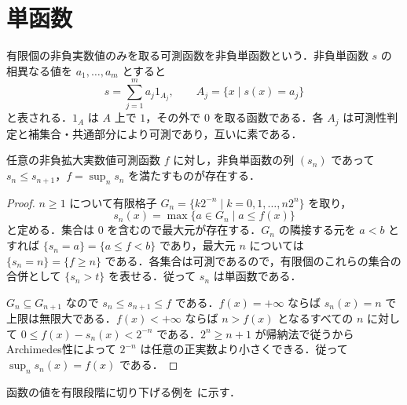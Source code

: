 \section{単函数}
\begin{defn}[単函数]
有限個の非負実数値のみを取る可測函数を非負単函数という．非負単函数 $s$ の相異なる値を $a_1,\ldots,a_m$ とすると
\[
 s=\sum_{j=1}^m a_j1_{A_j},\qquad A_j=\{x\mid s(x)=a_j\}
\]
と表される．$1_A$ は $A$ 上で $1$，その外で $0$ を取る函数である．各 $A_j$ は可測性判定と補集合・共通部分により可測であり，互いに素である．
\end{defn}
\begin{prop}[非負可測函数の単函数近似]
任意の非負拡大実数値可測函数 $f$ に対し，非負単函数の列 $(s_n)$ であって $s_n\leq s_{n+1}$，$f=\sup_n s_n$ を満たすものが存在する．
\end{prop}
\begin{proof}
$n\geq1$ について有限格子 $G_n=\{k2^{-n}\mid k=0,1,\ldots,n2^n\}$ を取り，
\[
 s_n(x)=\max\{a\in G_n\mid a\leq f(x)\}
\]
と定める．集合は $0$ を含むので最大元が存在する．$G_n$ の隣接する元を $a<b$ とすれば $\{s_n=a\}=\{a\leq f<b\}$ であり，最大元 $n$ については $\{s_n=n\}=\{f\geq n\}$ である．各集合は可測であるので，有限個のこれらの集合の合併として $\{s_n>t\}$ を表せる．従って $s_n$ は単函数である．

$G_n\subseteq G_{n+1}$ なので $s_n\leq s_{n+1}\leq f$ である．$f(x)=+\infty$ ならば $s_n(x)=n$ で上限は無限大である．$f(x)<+\infty$ ならば $n>f(x)$ となるすべての $n$ に対して $0\leq f(x)-s_n(x)<2^{-n}$ である．$2^n\geq n+1$ が帰納法で従うから Archimedes性によって $2^{-n}$ は任意の正実数より小さくできる．従って $\sup_n s_n(x)=f(x)$ である．
\end{proof}
函数の値を有限段階に切り下げる例を  に示す．
